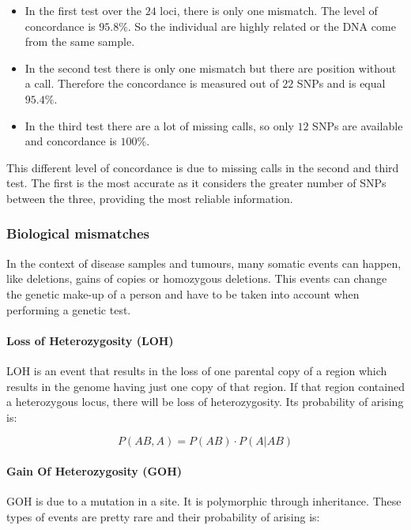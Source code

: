 			\begin{multicols}{2}
				\begin{itemize}
					\item In the first test over the $24$ loci, there is only one mismatch.
						The level of concordance is $95.8\%$.
						So the individual are highly related or the DNA come from the same sample.
					\item In the second test there is only one mismatch but there are position without a call.
						Therefore the concordance is measured out of $22$ SNPs and is equal $95.4\%$.
					\item In the third test there are a lot of missing calls, so only $12$ SNPs are available and concordance is $100\%$.
				\end{itemize}
			\end{multicols}

			This different level of concordance is due to missing calls in the second and third test.
			The first is the most accurate as it considers the greater number of SNPs between the three, providing the most reliable information.

		\subsubsection{Biological mismatches}
		In the context of disease samples and tumours, many somatic events can happen, like deletions, gains of copies or homozygous deletions.
		This events can change the genetic make-up of a person and have to be taken into account when performing a genetic test.

			\paragraph{Loss of Heterozygosity (LOH)}
			LOH is an event that results in the loss of one parental copy of a region which results in the genome having just one copy of that region.
			If that region contained a heterozygous locus, there will be loss of heterozygosity.
			Its probability of arising is:

			$$P(AB, A) = P(AB)\cdot P(A|AB)$$

			\paragraph{Gain Of Heterozygosity (GOH)}
			GOH is due to a mutation in a site.
			It is polymorphic through inheritance.
			These types of events are pretty rare and their probability of arising is:

